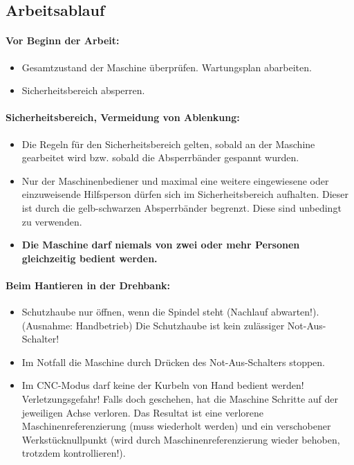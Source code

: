 \documentclass{\basedir/fablab-document}
\begin{document}
\subsection{Arbeitsablauf}
\paragraph{Vor Beginn der Arbeit:}
\begin{itemize}
\item Gesamtzustand der Maschine überprüfen. Wartungsplan abarbeiten.
\item Sicherheitsbereich absperren.
\end{itemize}

\paragraph{Sicherheitsbereich, Vermeidung von Ablenkung:}
\begin{itemize}
\item Die Regeln für den Sicherheitsbereich gelten, sobald an der Maschine gearbeitet wird bzw. sobald die Absperrbänder gespannt wurden.
\item Nur der Maschinenbediener und maximal eine weitere eingewiesene oder einzuweisende Hilfsperson dürfen sich im Sicherheitsbereich aufhalten. Dieser ist durch die gelb-schwarzen Absperrbänder begrenzt. Diese sind unbedingt zu verwenden.
\item \textbf{Die Maschine darf niemals von zwei oder mehr Personen gleichzeitig bedient werden.}
\end{itemize}

\paragraph{Beim Hantieren in der Drehbank:}
\begin{itemize}
 \item Schutzhaube nur öffnen, wenn die Spindel steht (Nachlauf abwarten!). (Ausnahme: Handbetrieb) Die Schutzhaube ist kein zulässiger Not-Aus-Schalter!
\item Im Notfall die Maschine durch Drücken des Not-Aus-Schalters stoppen.
\item Im CNC-Modus darf keine der Kurbeln von Hand bedient werden! Verletzungsgefahr! Falls doch geschehen, hat die Maschine Schritte auf der jeweiligen Achse verloren. Das Resultat ist eine verlorene Maschinenreferenzierung (muss wiederholt werden) und ein verschobener Werkstücknullpunkt (wird durch Maschinenreferenzierung wieder behoben, trotzdem kontrollieren!).
\end{itemize}
\end{document}
